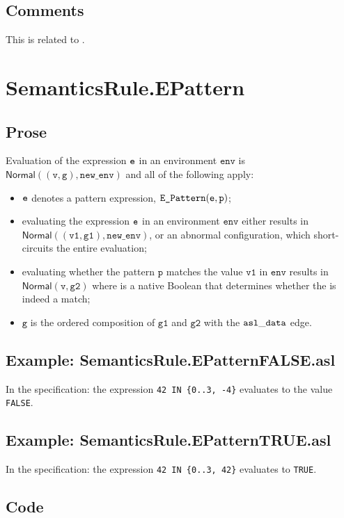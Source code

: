 \documentclass{book}
\newcommand\ProseOrAbnormal[0]{or an abnormal configuration, which short-circuits the entire evaluation}
\newcommand\Normal[0]{\textsf{Normal}}
\newcommand\newenv[0]{\texttt{new\_env}}
\newcommand\env[0]{\texttt{env}}
\newcommand\vg[0]{\texttt{g}}
\newcommand\vp[0]{\texttt{p}}
\newcommand\vv[0]{\texttt{v}}
\newcommand\vvone[0]{\texttt{v1}}
\newcommand\vgone[0]{\texttt{g1}}
\newcommand\vgtwo[0]{\texttt{g2}}
\begin{document}
\subsection{Comments}
  This is related to .

\section{SemanticsRule.EPattern \label{sec:SemanticsRule.EPattern}}
  \subsection{Prose}
  Evaluation of the expression $\texttt{e}$ in an environment $\env$ is \\
  $\Normal((\vv, \vg), \newenv)$ and all of the following apply:
  \begin{itemize}
  \item $\texttt{e}$ denotes a pattern expression, $\texttt{E\_Pattern}(\ve, \vp)$;
  \item evaluating the expression $\texttt{e}$ in an environment $\env$ either results in \\
  $\Normal((\vvone, \vgone), \newenv)$, \ProseOrAbnormal;
  \item evaluating whether the pattern $\vp$ matches the value $\vvone$ in $\env$
  results in $\Normal(\vv, \vgtwo)$ where is a native Boolean that determines
  whether the is indeed a match;
  \item $\vg$ is the ordered composition of $\vgone$ and $\vgtwo$ with the $\mathtt{asl\_data}$ edge.
  \end{itemize}

  \subsection{Example: SemanticsRule.EPatternFALSE.asl}
    In the specification:
    the expression \texttt{42 IN \{0..3, -4\}} evaluates to the value \texttt{FALSE}.

  \subsection{Example: SemanticsRule.EPatternTRUE.asl}
    In the specification:
    the expression \texttt{42 IN \{0..3, 42\}} evaluates to \texttt{TRUE}.

  \subsection{Code}
\end{document}
